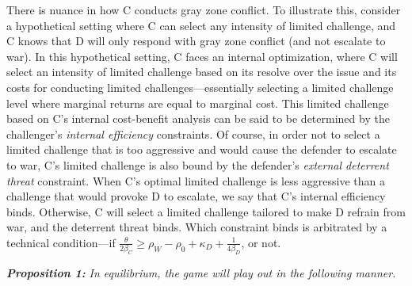 \documentclass[11pt,letterpaper,pdftex,dvipsnames,table]{article}
\begin{document}
There is nuance in how C conducts gray zone conflict. To illustrate this, consider a hypothetical setting where C can select any intensity of limited challenge, and C knows that D will only respond with gray zone conflict (and not escalate to war). In this hypothetical setting, C faces an internal optimization, where C will select an intensity of limited challenge based on its resolve over the issue and its costs for conducting limited challenges---essentially selecting a limited challenge level where marginal returns are equal to marginal cost. This limited challenge based on C's internal cost-benefit analysis can be said to be determined by the challenger's \textit{internal efficiency} constraints. Of course, in order not to select a limited challenge that is too aggressive and would cause the defender to escalate to war, C's limited challenge is also bound by the defender's \textit{external deterrent threat} constraint. When C's optimal limited challenge is less aggressive than a challenge that would provoke D to escalate, we say that C's internal efficiency binds. Otherwise, C will select a limited challenge tailored to make D refrain from war, and the deterrent threat binds. Which constraint binds is arbitrated by a technical condition---if \textit{$\frac{\theta}{2\beta_{C}}\geq\rho_{W}-\rho_{0}+\kappa_{D}+\frac{1}{4\beta_{D}}$}, or not.
    
    \textbf{\textit{Proposition 1:}}\textit{ In equilibrium, the game will play out in the following manner.}
    
\end{document}
